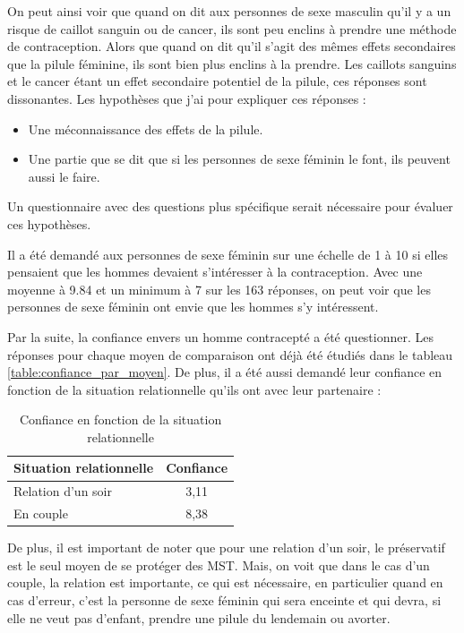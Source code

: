 \documentclass[12pt,a4paper]{report}
\begin{document}
On peut ainsi voir que quand on dit aux personnes de sexe masculin qu'il y a un risque de caillot sanguin ou de cancer, ils sont peu enclins à prendre une méthode de contraception. Alors que quand on dit qu'il s'agit des mêmes effets secondaires que la pilule féminine, ils sont bien plus enclins à la prendre. Les caillots sanguins et le cancer étant un effet secondaire potentiel de la pilule, ces réponses sont dissonantes. Les hypothèses que j'ai pour expliquer ces réponses :
\begin{itemize}
    \item Une méconnaissance des effets de la pilule.
    \item Une partie que se dit que si les personnes de sexe féminin le font, ils peuvent aussi le faire.
\end{itemize}
Un questionnaire avec des questions plus spécifique serait nécessaire pour évaluer ces hypothèses.

Il a été demandé aux personnes de sexe féminin sur une échelle de 1 à 10 si elles pensaient que les hommes devaient s'intéresser à la contraception. Avec une moyenne à 9.84 et un minimum à 7 sur les 163 réponses, on peut voir que les personnes de sexe féminin ont envie que les hommes s'y intéressent.

Par la suite, la confiance envers un homme contracepté a été questionner. Les réponses pour chaque moyen de comparaison ont déjà été étudiés dans le tableau \ref{table:confiance_par_moyen}. De plus, il a été aussi demandé leur confiance en fonction de la situation relationnelle qu'ils ont avec leur partenaire :

\begin{table}[ht]
\centering
\begin{tabular}{|l|c|}
\hline
\textbf{Situation relationnelle} & \textbf{Confiance} \\
\hline
Relation d'un soir & 3,11 \\
En couple & 8,38 \\
\hline
\end{tabular}
\caption{Confiance en fonction de la situation relationnelle}
\end{table}

De plus, il est important de noter que pour une relation d'un soir, le préservatif est le seul moyen de se protéger des MST. Mais, on voit que dans le cas d'un couple, la relation est importante, ce qui est nécessaire, en particulier quand en cas d'erreur, c'est la personne de sexe féminin qui sera enceinte et qui devra, si elle ne veut pas d'enfant, prendre une pilule du lendemain ou avorter.
\end{document}
